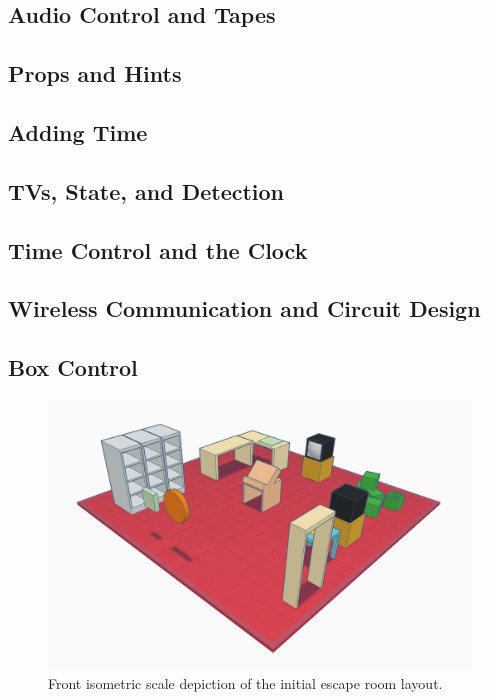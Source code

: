 \documentclass[conference]{IEEEtran}
\begin{document}
\subsection{Audio Control and Tapes}

\subsection{Props and Hints}

\subsection{Adding Time} %

\subsection{TVs, State, and Detection}

\subsection{Time Control and the Clock}

\subsection{Wireless Communication and Circuit Design} %

\subsection{Box Control}

\begin{figure}[ht]
    \centering
    \includegraphics[width=0.90\columnwidth]{Images/EscapeRoomIsoFront.jpg}
    \caption{Front isometric scale depiction of the initial escape room layout.}
\end{figure}
\end{document}
